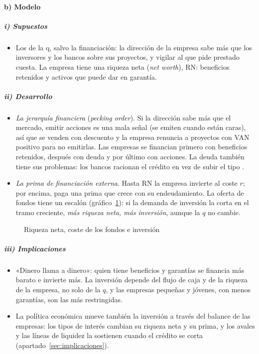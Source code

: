 \documentclass[11pt]{article}
\begin{document}
\paragraph{b) Modelo}

\subparagraph{i) Supuestos}

\begin{itemize}
\item Los de la q, salvo la financiación: la dirección de la empresa sabe más que los inversores y los bancos sobre sus proyectos, y vigilar al que pide prestado cuesta. La empresa tiene una riqueza neta (\emph{net worth}), $\mathrm{RN}$: beneficios retenidos y activos que puede dar en garantía.
\end{itemize}

\subparagraph{ii) Desarrollo}

\begin{itemize}
\item \emph{La jerarquía financiera} (\emph{pecking order}). Si la dirección sabe más que el mercado, emitir acciones es una mala señal (se emiten cuando están caras), así que se venden con descuento y la empresa renuncia a proyectos con VAN positivo para no emitirlas\nocite{MyersMajluf1984Corporate}. Las empresas se financian primero con beneficios retenidos, después con deuda y por último con acciones\nocite{Myers1984Capital}. La deuda también tiene sus problemas: los bancos racionan el crédito en vez de subir el tipo .
\item \emph{La prima de financiación externa}. Hasta $\mathrm{RN}$ la empresa invierte al coste $r$; por encima, paga una prima que crece con su endeudamiento. La oferta de fondos tiene un escalón (gráfico~\ref{fig:coste-fondos}): si la demanda de inversión la corta en el tramo creciente, \emph{más riqueza neta, más inversión}, aunque la $q$ no cambie.
\end{itemize}

\begin{figure}[H]
\centering
\caption{Riqueza neta, coste de los fondos e inversión}\label{fig:coste-fondos}
\end{figure}

\subparagraph{iii) Implicaciones}

\begin{itemize}
\item «Dinero llama a dinero»: quien tiene beneficios y garantías se financia más barato e invierte más. La inversión depende del flujo de caja y de la riqueza de la empresa, no solo de la $q$, y las empresas pequeñas y jóvenes, con menos garantías, son las más restringidas.
\item La política económica mueve también la inversión a través del balance de las empresas: los tipos de interés cambian su riqueza neta y su prima, y los avales y las líneas de liquidez la sostienen cuando el crédito se corta (apartado~\ref{sec:implicaciones}).
\end{itemize}
\end{document}
